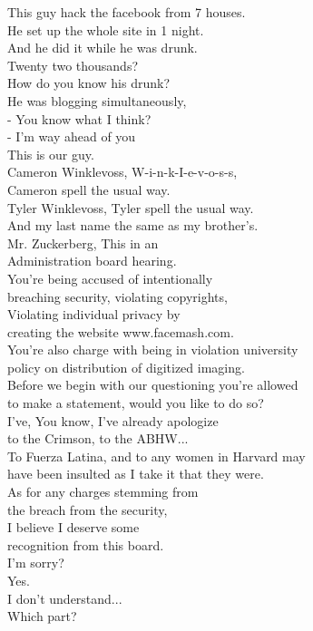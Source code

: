 \documentclass{article}
\begin{document}
\begin{multicols}{3}
This guy hack the facebook from 7 houses.\\
He set up the whole site in 1 night.\\
And he did it while he was drunk.\\
Twenty two thousands?\\
How do you know his drunk?\\
He was blogging simultaneously,\\
- You know what I think?\\
- I'm way ahead of you\\
This is our guy.\\
Cameron Winklevoss, W-i-n-k-I-e-v-o-s-s,\\
Cameron spell the usual way.\\
Tyler Winklevoss, Tyler spell the usual way.\\
And my last name the same as my brother's.\\
Mr. Zuckerberg, This in an\\
Administration board hearing.\\
You're being accused of intentionally\\
breaching security, violating copyrights,\\
Violating individual privacy by\\
creating the website www.facemash.com.\\
You're also charge with being in violation university\\
policy on distribution of digitized imaging.\\
Before we begin with our questioning you're allowed\\
to make a statement, would you like to do so?\\
I've, You know, I've already apologize\\
to the Crimson, to the ABHW...\\
To Fuerza Latina, and to any women in Harvard may\\
have been insulted as I take it that they were.\\
As for any charges stemming from\\
the breach from the security,\\
I believe I deserve some\\
recognition from this board.\\
I'm sorry?\\
Yes.\\
I don't understand...\\
Which part?\\

\end{multicols}
\end{document}
